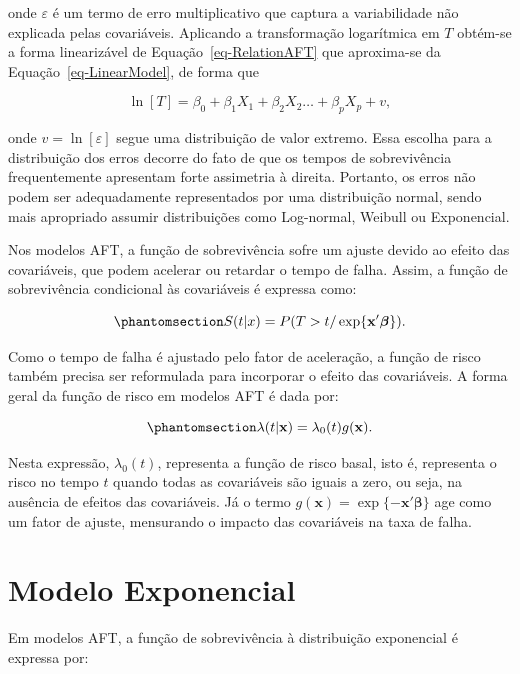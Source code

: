 \documentclass[
  12pt,
  letterpaper,
  DIV=11,
  numbers=noendperiod]{scrreprt}
\begin{document}
onde \(\varepsilon\) é um termo de erro multiplicativo que captura a
variabilidade não explicada pelas covariáveis. Aplicando a transformação
logarítmica em \(T\) obtém-se a forma linearizável de
Equação~\ref{eq-RelationAFT} que aproxima-se da
Equação~\ref{eq-LinearModel}, de forma que

\[
\ln[T] = \beta_{0} + \beta_{1} X_{1} + \beta_{2} X_{2} \ldots + \beta_{p} X_{p} + v,
\]

onde \(v = \ln[\varepsilon]\) segue uma distribuição de valor extremo.
Essa escolha para a distribuição dos erros decorre do fato de que os
tempos de sobrevivência frequentemente apresentam forte assimetria à
direita. Portanto, os erros não podem ser adequadamente representados
por uma distribuição normal, sendo mais apropriado assumir distribuições
como Log-normal, Weibull ou Exponencial.

Nos modelos AFT, a função de sobrevivência sofre um ajuste devido ao
efeito das covariáveis, que podem acelerar ou retardar o tempo de falha.
Assim, a função de sobrevivência condicional às covariáveis é expressa
como:

\begin{equation}\phantomsection\label{eq-fSobrAFT}{
S (t | x) = P (T > t / \exp\{ \mathbf{x'} \boldsymbol{\beta}\}).
}\end{equation}

Como o tempo de falha é ajustado pelo fator de aceleração, a função de
risco também precisa ser reformulada para incorporar o efeito das
covariáveis. A forma geral da função de risco em modelos AFT é dada por:

\begin{equation}\phantomsection\label{eq-fhazardAFT}{
\lambda(t | \mathbf{x}) = \lambda_{0}(t) g(\mathbf{x}).
}\end{equation}

Nesta expressão, \(\lambda_{0}(t)\), representa a função de risco basal,
isto é, representa o risco no tempo \(t\) quando todas as covariáveis
são iguais a zero, ou seja, na ausência de efeitos das covariáveis. Já o
termo \(g(\mathbf{x}) = \exp\{ - \mathbf{x'} \boldsymbol{\beta} \}\) age
como um fator de ajuste, mensurando o impacto das covariáveis na taxa de
falha.

\section{Modelo Exponencial}\label{modelo-exponencial}

Em modelos AFT, a função de sobrevivência à distribuição exponencial é
expressa por:
\end{document}
